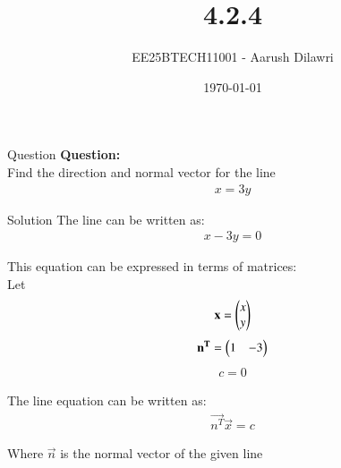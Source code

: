 \documentclass{beamer}
\title{4.2.4}
\date{\today}
\author{EE25BTECH11001 - Aarush Dilawri}
\begin{document}
\frame{\titlepage}

\begin{frame}{Question}
\textbf{Question:} \\
Find the direction and normal vector for the line 
\begin{align}
x = 3y
\end{align}
\end{frame}

\begin{frame}{Solution}
The line can be written as: 
\begin{align}
x - 3y =0
\end{align}

This equation can be expressed in terms of matrices:\\
Let
\begin{align}
\mathbf{x} = \begin{pmatrix}x \\ y\end{pmatrix}
\end{align}
\begin{align}
\mathbf{n^T} = \begin{pmatrix}1 & -3\end{pmatrix}
\end{align}
\begin{align}
c = 0
\end{align}

The line equation can be written as:
\begin{align}
\vec{n^T}  \vec{x} = c
\end{align}

Where $\vec{n}$ is the normal vector of the given line
\end{frame}
\end{document}
